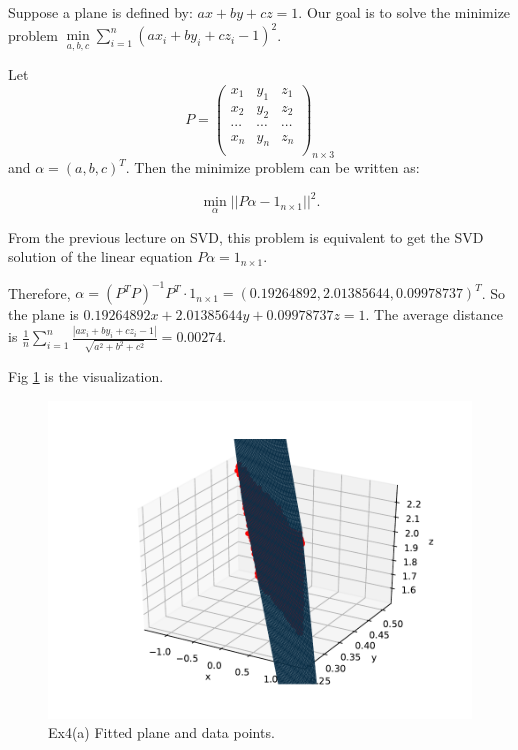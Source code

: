 \documentclass[
  course = {{16-811 Math Fundamentals for Robotics}},
  quartile = {{1}},
  assignment = 3,
  name = {{Kangle Deng}},
  email = {{kangled@andrew.cmu.edu}},
  firstexercise = 1
]{aga-homework}
\begin{document}
\exercise
\subexercise
Suppose a plane is defined by: $ax + by + cz = 1$. Our goal is to solve the minimize problem $\min \limits_{a,b,c} \sum \limits_{i=1}^n (ax_i + by_i + cz_i - 1)^2$.

Let
\begin{equation*}
    P = \left(
    \begin{array}{ccc}
        x_1 & y_1 & z_1 \\
        x_2 & y_2 & z_2 \\
        \cdots & \cdots & \cdots \\
        x_n & y_n & z_n \\
    \end{array}
    \right)_{n \times 3}
\end{equation*}
and $\alpha = (a,b,c)^T$. Then the minimize problem can be written as:

\begin{equation*}
    \min_{\alpha} ||P\alpha - 1_{n \times 1} ||^2.
\end{equation*}

From the previous lecture on SVD, this problem is equivalent to get the SVD solution of the linear equation $P\alpha = 1_{n \times 1}$.

Therefore, $\alpha = (P^TP)^{-1}P^T\cdot 1_{n \times 1} = (0.19264892, 2.01385644, 0.09978737)^T$. So the plane is $0.19264892x + 2.01385644y + 0.09978737z = 1$. The average distance is $\frac{1}{n} \sum \limits_{i=1}^n \frac{|ax_i+by_i+cz_i-1|}{\sqrt{a^2+b^2+c^2}} = 0.00274$.

Fig \ref{fig:hw3_ex4a} is the visualization.

\begin{figure}
    \centering
    \includegraphics{math/fig/hw3/ex4a.pdf}
    \caption{Ex4(a) Fitted plane and data points.}
    \label{fig:hw3_ex4a}
\end{figure}
\end{document}
